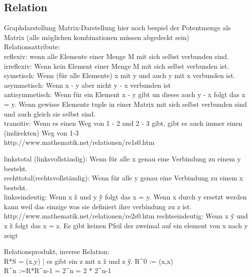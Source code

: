 \subsection{Relation}

Graphdarstellung
Matrix-Darstellung hier noch bespiel der Potentmenge als Matrix (alle möglichen kombinationen müssen abgedeckt sein)\\


Relationsattribute:\\

reflexiv: wenn alle Elemente einer Menge M mit sich selbst verbunden sind.\\

irreflexiv: Wenn kein Element einer Menge M mit sich selbst verbunden ist.\\

symetisch: Wenn (für alle Elemente) x mit y und auch y mit x verbunden ist.\\

asymmetisch: Wenn x - y aber nicht y - x verbunden ist\\

antisymmetisch: Wenn für ein Element x - y gibt un dieses auch y - x folgt das x = y. Wenn gewisse Elemente tuple in einer Matrix mit sich selbst verbunden sind und auch gleich sie selbst sind.\\

transitiv: Wenn es einen Weg von 1 - 2 und 2 - 3 gibt, gibt es auch immer einen (indirekten) Weg von 1-3\\
 
http://www.mathematik.net/relationen/re1s0.htm
 
 
linkstotal (linksvollständig): Wenn für alle x genau eine Verbindung zu einem y besteht.\\

rechttotal(rechtsvollständig): Wenn für alle y genau eine Verbindung zu einem x besteht.\\

linkseindeutig: Wenn x \~ z und y \~ y folgt das x = y. Wenn x durch y ersetzt werden kann weil das einzige was sie definiert ihre verbindung zu z ist.\\


http://www.mathematik.net/relationen/re2s0.htm
rechtseindeutig: 
 Wenn x \~ y und x \~ z folgt das x = z. Es gibt keinen Pfeil der zweimal auf ein element von x nach y zeigt

Relationsprodukt, inverse Relation:  \\
R*S = (x,y) | es gibt ein z mit x \~ z und z \~y.
R^0 := (x,x)\\ 
R^n :=R*R^n-1 = 2^n = 2 * 2^n-1\\

